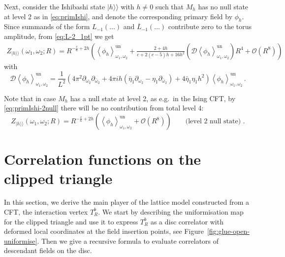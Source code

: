 \documentclass[11pt,a4paper]{article}
\numberwithin{equation}{section}
\def\ket#1{|{#1}\rangle}
\begin{document}
Next, consider the Ishibashi state $\ket{h}\!\rangle$ with $h \neq 0$ such that $M_h$ has no null state at level 2 as in \eqref{eq:primIshi}, and denote the corresponding primary field by $\phi_h$. Since summands of the form $L_{-1}(\dots)$ and $\overline L_{-1}(\dots)$ contribute zero to the torus amplitude, from \eqref{eq:L-2_1pt} we get
%
\begin{align}
    Z_{\ket{h}\!\rangle}(\omega_1,\omega_2;R) = R^{-\frac{c}{6} +2 h}\! \left(\left\langle\phi_h\right\rangle^{\mathrm{un}}_{\omega_1,\omega_2} + \tfrac{2+4h}{c+2(c-5)h+16h^2} \!\left(\mathcal{D}\left\langle\phi_h\right\rangle^{\mathrm{un}}_{\omega_1,\omega_2}\right) R^{4} + \mathcal{O}\!\left(R^8\right) \right) \label{eq:ZIship}
\end{align}
%
with
%
\begin{equation}
    \mathcal{D}\left\langle\phi_h\right\rangle^{\mathrm{un}}_{\omega_1,\omega_2} = \frac{1}{L^2}\left(4\pi^2 \partial_{\omega_2}\partial_{\bar{\omega}_2}  + 4\pi i h \left( \bar{\eta}_1 \partial_{\omega_2}  -  \eta_1 \partial_{\bar{\omega}_2}\right) + 4\bar{\eta}_1\eta_1 h^2\right) \left\langle\phi_h\right\rangle^{\mathrm{un}}_{\omega_1,\omega_2}\,.
\end{equation}

\noindent 
Note that in case $M_h$ has a null state at level 2, as e.g.\ in the Ising CFT, by \eqref{eq:primIshi-2null} there will be no contribution from total level 4: 
\begin{equation}\label{eq-1h-torus-level2null}
    Z_{\ket{h}\!\rangle}(\omega_1,\omega_2;R) = R^{-\frac{c}{6} +2 h} \left(\left\langle\phi_h\right\rangle^{\mathrm{un}}_{\omega_1,\omega_2}  + \mathcal{O}\!\left(R^8\right) \right)
    \qquad \text{(level 2 null state) .}
\end{equation}

\section{Correlation functions on the clipped triangle}\label{sec:openstring}

In this section, we derive the main player of the lattice model constructed from a CFT, the interaction vertex $T^b_R$. We start by describing the uniformisation map for the clipped triangle and use it to express $T^b_R$ as a disc correlator with deformed local coordinates at the field insertion points, see Figure~\ref{fig:glue-open-uniformise}. Then we give a recursive formula to evaluate correlators of descendant fields on the disc. 
\end{document}
